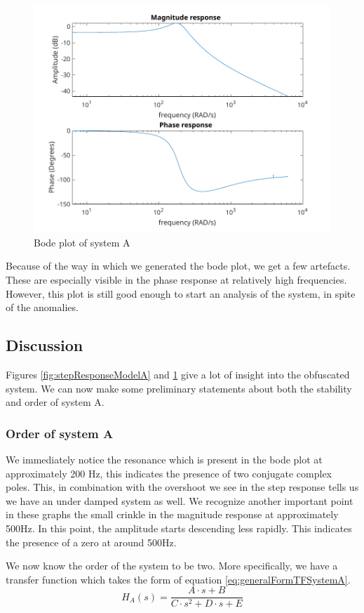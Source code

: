 \documentclass[a4paper,kul]{kulakarticle} %
\begin{document}
			\begin{figure}[h]
				\centering
				\includegraphics[width=0.7\linewidth]{generatedBodeSystemA}
				\caption[Bode of system A]{Bode plot of system A}
				\label{fig:bodePlotModelA}
			\end{figure}
			Because of the way in which we generated the bode plot, we get a few artefacts. These are especially visible  in the phase response at relatively high frequencies. However, this plot is still good enough to start an analysis of the system, in spite of the anomalies.
		
		\subsection{Discussion}
			Figures \ref{fig:stepResponseModelA} and \ref{fig:bodePlotModelA} give a lot of insight into the obfuscated system. We can now make some preliminary statements about both the stability and order of system A. 
			
			\subsubsection{Order of system A}
				\label{sec:OrderSystemA}
				We immediately notice the resonance which is present in the bode plot at approximately 200 Hz, this indicates the presence of two conjugate complex poles. This, in combination with the overshoot we see in the step response tells us we have an under damped system as well. We recognize another important point in these graphs the small crinkle in the magnitude response at approximately 500Hz. In this point, the amplitude starts descending less rapidly. This indicates the presence of a zero at around 500Hz. 
				\newline
				
				We now know the order of the system to be two. More specifically, we have a transfer function which takes the form of equation \ref{eq:generalFormTFSystemA}.
				\begin{equation}
					\label{eq:generalFormTFSystemA}
					H_A(s)=\frac{A\cdot s+B}{C\cdot s^2 + D\cdot s + E}
				\end{equation} 
				
\end{document}
